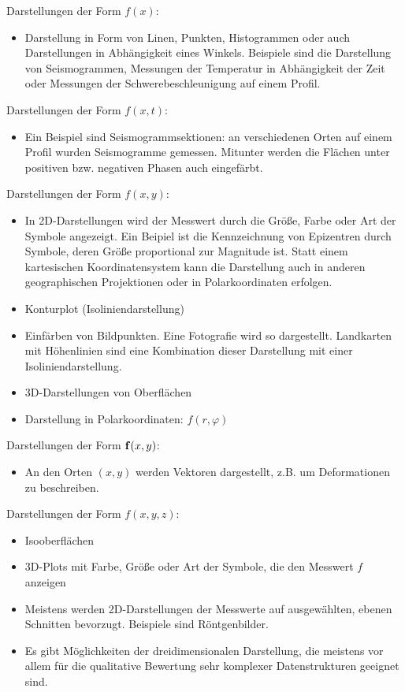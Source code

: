 \noindent Darstellungen der Form $f(x)$:
\begin{itemize}
    \item Darstellung in Form von Linen, Punkten, Histogrammen oder auch Darstellungen in Abhängigkeit eines Winkels. Beispiele sind die Darstellung von Seismogrammen, Messungen der Temperatur in Abhängigkeit der Zeit oder Messungen der Schwerebeschleunigung auf einem Profil. 
  \end{itemize}
  
\noindent Darstellungen der Form  $f(x,t)$: 
\begin{itemize}
\item
Ein Beispiel sind Seismogrammsektionen: an verschiedenen Orten auf einem Profil wurden Seismogramme gemessen. Mitunter werden die Flächen unter positiven bzw. negativen Phasen auch eingefärbt.
\end{itemize}

\noindent Darstellungen der Form $f(x,y)$:
\begin{itemize}
\item In 2D-Darstellungen wird der Messwert durch die Größe, Farbe oder Art der Symbole angezeigt. Ein Beipiel ist die Kennzeichnung von Epizentren durch Symbole, deren Größe proportional zur Magnitude ist. Statt einem kartesischen Koordinatensystem kann die Darstellung auch in anderen geographischen Projektionen oder in Polarkoordinaten erfolgen.
\item Konturplot (Isoliniendarstellung)
\item Einfärben von Bildpunkten. Eine Fotografie wird so dargestellt. Landkarten mit Höhenlinien sind eine Kombination dieser Darstellung mit einer Isoliniendarstellung.
\item 3D-Darstellungen von Oberflächen 
\item Darstellung in Polarkoordinaten: $f(r,\varphi)$
  \end{itemize}
  
\noindent Darstellungen der Form $ {\bf f}(x,y)$:
\begin{itemize}
\item
An den Orten $(x,y)$ werden Vektoren dargestellt, z.B. um Deformationen zu beschreiben.
\end{itemize}

\noindent Darstellungen der Form $f(x,y,z)$:
\begin{itemize}
\item Isooberflächen   
\item 3D-Plots mit Farbe, Größe oder Art der Symbole, die den Messwert $f$ anzeigen
\item Meistens werden 2D-Darstellungen der Messwerte auf ausgewählten, ebenen Schnitten bevorzugt. Beispiele sind Röntgenbilder.  
\item Es gibt Möglichkeiten der dreidimensionalen Darstellung, die meistens vor allem für die qualitative Bewertung sehr komplexer Datenstrukturen geeignet sind. 
  \end{itemize}
  
